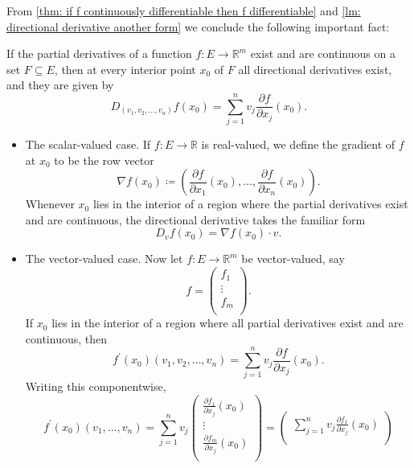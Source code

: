 \begin{remark}
    From \autoref{thm: if f continuously differentiable then f differentiable} and \autoref{lm: directional derivative another form} we conclude the following important fact:
    
    If the partial derivatives of a function \(f: E \to \mathbb{R} ^m\) exist and are continuous on a set \(F \subseteq E\), then at every interior point \(x_0\) of \(F\) all directional derivatives exist, and they are given by 
    \[
        D_{(v_1, v_2, \dots , v_n)} f(x_0) = \sum_{j=1}^n v_j \frac{\partial f}{\partial x_j}(x_0).  
    \]    
    \begin{itemize}
        \item The scalar-valued case. If \(f: E \to \mathbb{R} \) is real-valued, we define the gradient of \(f\) at \(x_0\) to be the row vector 
        \[
            \nabla f(x_0) \coloneqq \left( \frac{\partial f}{\partial x_1}(x_0), \dots , \frac{\partial f}{\partial x_n}(x_0)   \right). 
        \]
        Whenever \(x_0\) lies in the interior of a region where the partial derivatives exist and are continuous, the directional derivative takes the familiar form 
        \[
            D_v f(x_0) = \nabla f(x_0)\cdot v.
        \]
        \item The vector-valued case. Now let \(f: E \to \mathbb{R} ^m\) be vector-valued, say 
        \[
            f = \begin{pmatrix}
                 f_1 \\
                 \vdots \\
                 f_m \\
            \end{pmatrix}.
        \]
        If \(x_0\) lies in the interior of a region where all partial derivatives exist and are continuous, then 
        \[
            f^{\prime} (x_0) (v_1, v_2, \dots , v_n) = \sum_{j=1}^n v_j \frac{\partial f}{\partial x_j} (x_0).  
        \] 
        Writing this componentwise, 
        \[
            f^{\prime} (x_0)(v_1, \dots , v_n) = \sum_{j=1}^n v_j \begin{pmatrix}
                 \frac{\partial f_1}{\partial x_j} (x_0)  \\
                  \vdots \\
                  \frac{\partial f_m}{\partial x_j} (x_0) \\
            \end{pmatrix} = \begin{pmatrix}
                 \sum_{j=1}^n v_j \frac{\partial f_1}{\partial x_j} (x_0)   \\

\end{pmatrix}\]
\end{itemize}
\end{remark}
